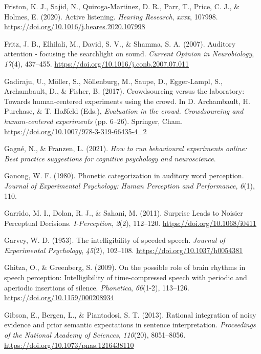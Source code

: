 \documentclass[a4paper, nobind]{templates/ociamthesis}
\newlength{\cslhangindent}
\newenvironment{CSLReferences}[2] %
 {%
  \setlength{\parindent}{0pt}
  \ifodd #1
  \let\oldpar\par
  \def\par{\hangindent=\cslhangindent\oldpar}
  \fi
  \setlength{\parskip}{1mm}
  \setlength{\baselineskip}{6mm}
 }%
 {}
\begin{document}
\begin{CSLReferences}{1}{0}
\leavevmode{}%
Friston, K. J., Sajid, N., Quiroga-Martinez, D. R., Parr, T., Price, C. J., \& Holmes, E. (2020). {Active listening}. \emph{Hearing Research}, \emph{xxxx}, 107998. \url{https://doi.org/10.1016/j.heares.2020.107998}

\leavevmode{}%
Fritz, J. B., Elhilali, M., David, S. V., \& Shamma, S. A. (2007). {Auditory attention - focusing the searchlight on sound}. \emph{Current Opinion in Neurobiology}, \emph{17}(4), 437--455. \url{https://doi.org/10.1016/j.conb.2007.07.011}

\leavevmode{}%
Gadiraju, U., Möller, S., Nöllenburg, M., Saupe, D., Egger-Lampl, S., Archambault, D., \& Fisher, B. (2017). {Crowdsourcing versus the laboratory: Towards human-centered experiments using the crowd}. In D. Archambault, H. Purchase, \& T. Hoßfeld (Eds.), \emph{Evaluation in the crowd. Crowdsourcing and human-centered experiments} (pp. 6--26). Springer, Cham. \url{https://doi.org/10.1007/978-3-319-66435-4_2}

\leavevmode{}%
Gagné, N., \& Franzen, L. (2021). \emph{How to run behavioural experiments online: Best practice suggestions for cognitive psychology and neuroscience}.

\leavevmode{}%
Ganong, W. F. (1980). Phonetic categorization in auditory word perception. \emph{Journal of Experimental Psychology: Human Perception and Performance}, \emph{6}(1), 110.

\leavevmode{}%
Garrido, M. I., Dolan, R. J., \& Sahani, M. (2011). Surprise Leads to Noisier Perceptual Decisions. \emph{I-Perception}, \emph{2}(2), 112--120. \url{https://doi.org/10.1068/i0411}

\leavevmode{}%
Garvey, W. D. (1953). {The intelligibility of speeded speech}. \emph{Journal of Experimental Psychology}, \emph{45}(2), 102--108. \url{https://doi.org/10.1037/h0054381}

\leavevmode{}%
Ghitza, O., \& Greenberg, S. (2009). {On the possible role of brain rhythms in speech perception: Intelligibility of time-compressed speech with periodic and aperiodic insertions of silence}. \emph{Phonetica}, \emph{66}(1-2), 113--126. \url{https://doi.org/10.1159/000208934}

\leavevmode{}%
Gibson, E., Bergen, L., \& Piantadosi, S. T. (2013). Rational integration of noisy evidence and prior semantic expectations in sentence interpretation. \emph{Proceedings of the National Academy of Sciences}, \emph{110}(20), 8051--8056. \url{https://doi.org/10.1073/pnas.1216438110}


\end{CSLReferences}
\end{document}
